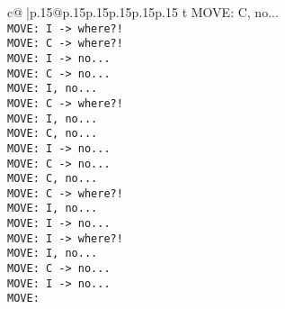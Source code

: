 \documentclass{article}
\begin{document}
{\begin{supertabular}{c@{$\;$}|p{.15\linewidth}@{}p{.15\linewidth}p{.15\linewidth}p{.15\linewidth}p{.15\linewidth}p{.15\linewidth}}
{{{t  MOVE: C, no...\\ \tt  MOVE: I -> where?!\\ \tt  MOVE: C -> where?!\\ \tt  MOVE: I -> no...\\ \tt  MOVE: C -> no...\\ \tt  MOVE: I, no...\\ \tt  MOVE: C -> where?!\\ \tt  MOVE: I, no...\\ \tt  MOVE: C, no...\\ \tt  MOVE: I -> no...\\ \tt  MOVE: C -> no...\\ \tt  MOVE: C, no...\\ \tt  MOVE: C -> where?!\\ \tt  MOVE: I, no...\\ \tt  MOVE: I -> no...\\ \tt  MOVE: I -> where?!\\ \tt  MOVE: I, no...\\ \tt  MOVE: C -> no...\\ \tt  MOVE: I -> no...\\ \tt  MOVE: }}}
\end{supertabular}}
\end{document}
